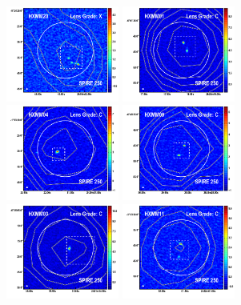 \documentclass[iop]{emulateapj}
\begin{document}
\begin{figure}[!tbp]
\begin{centering}
\includegraphics[width=0.331\textwidth]{../Figures/overlays/HXMM20_870_250.pdf}
\includegraphics[width=0.331\textwidth]{../Figures/overlays/HXMM01_870_250.pdf}
\includegraphics[width=0.331\textwidth]{../Figures/overlays/HXMM04_870_250.pdf}
\includegraphics[width=0.331\textwidth]{../Figures/overlays/HXMM09_870_250.pdf}
\includegraphics[width=0.331\textwidth]{../Figures/overlays/HXMM03_870_250.pdf}
\includegraphics[width=0.331\textwidth]{../Figures/overlays/HXMM11_870_250.pdf}

\end{centering}
\end{figure}
\end{document}
